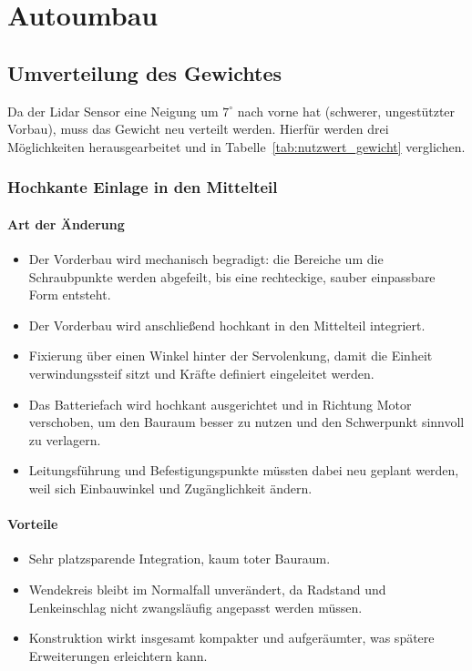 \section{Autoumbau}
\label{sec:autoumbau}
\subsection{Umverteilung des Gewichtes}
\label{sec:gewichtsumverteilung}
Da der Lidar Sensor eine Neigung um \(7^\circ\) nach vorne hat (schwerer, ungestützter Vorbau), muss das Gewicht neu verteilt werden. Hierfür werden drei Möglichkeiten herausgearbeitet und in Tabelle~\ref{tab:nutzwert_gewicht} verglichen.

\subsubsection{Hochkante Einlage in den Mittelteil}
\label{sec:hochkante_einlage}
\paragraph{Art der Änderung}
\begin{itemize}
  \item Der Vorderbau wird mechanisch begradigt: die Bereiche um die Schraubpunkte werden abgefeilt, bis eine rechteckige, sauber einpassbare Form entsteht.
  \item Der Vorderbau wird anschließend hochkant in den Mittelteil integriert.
  \item Fixierung über einen Winkel hinter der Servolenkung, damit die Einheit verwindungssteif sitzt und Kräfte definiert eingeleitet werden.
  \item Das Batteriefach wird hochkant ausgerichtet und in Richtung Motor verschoben, um den Bauraum besser zu nutzen und den Schwerpunkt sinnvoll zu verlagern.
  \item Leitungsführung und Befestigungspunkte müssten dabei neu geplant werden, weil sich Einbauwinkel und Zugänglichkeit ändern.
\end{itemize}

\paragraph{Vorteile}
\begin{itemize}
  \item Sehr platzsparende Integration, kaum toter Bauraum.
  \item Wendekreis bleibt im Normalfall unverändert, da Radstand und Lenkeinschlag nicht zwangsläufig angepasst werden müssen.
  \item Konstruktion wirkt insgesamt kompakter und aufgeräumter, was spätere Erweiterungen erleichtern kann.
\end{itemize}

